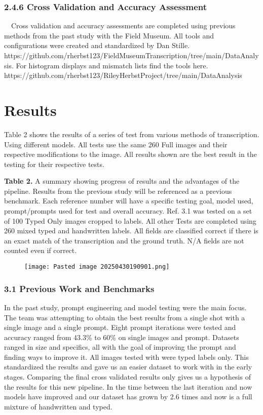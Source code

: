 \documentclass{article}
\begin{document}
\subsubsection*{2.4.6 Cross Validation and Accuracy Assessment}
$\quad$Cross validation and accuracy assessments are completed using previous methods from the past study with the Field Museum. All tools and configurations were created and standardized by Dan Stille. https://github.com/rherbst123/FieldMuseumTranscription/tree/main/DataAnalysis. For histogram displays and mismatch lists find the tools here. https://github.com/rherbst123/RileyHerbstProject/tree/main/DataAnalysis

\section{Results}
Table 2 shows the results of a series of test from various methods of transcription. Using different models. All tests use the same 260 Full images and their respective modifications to the image. All results shown are the best result in the testing for their respective tests. 

\noindent\textbf{Table 2.} A summary showing progress of results and the advantages of the pipeline. Results from the previous study will be referenced as a previous benchmark. Each reference number will have a specific testing goal, model used, prompt/prompts used for test and overall accuracy. Ref. 3.1 was tested on a set of 100 Typed Only images cropped to labels. All other Tests are completed using 260 mixed typed and handwritten labels. All fields are classified correct if there is an exact match of the transcription and the ground truth. N/A fields are not counted even if correct.

\begin{figure}
    \centering
    \texttt{[image: Pasted image 20250430190901.png]}
    
    \label{fig: Results of components of pipeline}
\end{figure}

\subsubsection*{3.1 Previous Work and Benchmarks}
In the past study, prompt engineering and model testing were the main focus. The team was attempting to obtain the best results from a single shot with a single image and a single prompt. Eight prompt iterations were tested and accuracy ranged from 43.3\% to 60\% on single images and prompt. Datasets ranged in size and specifics, all with the goal of improving the prompt and finding ways to improve it. All images tested with were typed labels only. This standardized the results and gave us an easier dataset to work with in the early stages. Comparing the final cross validated results only gives us a hypothesis of the results for this new pipeline. In the time between the last iteration and now models have improved and our dataset has grown by 2.6 times and now is a full mixture of handwritten and typed. 
\end{document}
